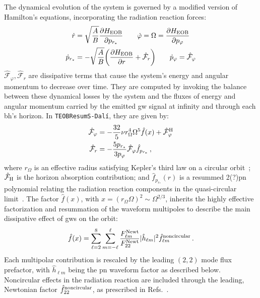 \documentclass[prd,amssymb,amsmath,amsfonts,nofootinbib,reprint,showpacs,longbibliography]{revtex4-1}
\newcommand{\dali}[0]{\texttt{TEOBResumS-Dalí}}
\begin{document}
The dynamical evolution of the system is governed by a modified version of Hamilton's equations,
incorporating the radiation reaction forces:
\begin{subequations}
\begin{align}
    \dot{r} &= \sqrt{\dfrac{A}{B}} \dfrac{\partial H_{\rm EOB}}{\partial p_{r_*}} \qquad 
    \dot{\varphi} = \Omega = \dfrac{\partial H_{\rm EOB}}{\partial p_\varphi} \\
    \dot{p}_{r_*} &= -\sqrt{\dfrac{A}{B}} \biggl(\dfrac{\partial H_{\rm EOB}}{\partial r} + \mathcal{\hat{F}}_r\biggr)\qquad 
    \dot{p}_\varphi = \mathcal{\hat{F}}_\varphi
\end{align}
\end{subequations}
$\mathcal{\hat{F}}_\varphi, \mathcal{\hat{F}}_r$ are dissipative terms that cause the system's
energy and angular momentum to decrease over time. They are computed by invoking the balance
between these dynamical losses by the system and the fluxes of energy and angular momentum
carried by the emitted \ac{gw} signal at infinity and through each \ac{bh}'s horizon.
In \dali, they are given by:
\begin{subequations}
\begin{align}
    \mathcal{\hat{F}}_\varphi &= -\dfrac{32}{5} \nu r_\Omega^4 \Omega^5 \hat{f}(x) + \mathcal{\hat{F}}^{\rm H}_\varphi \\
    \mathcal{\hat{F}}_r       &= -\dfrac{5p_{r_*}}{3p_\varphi} \mathcal{\hat{F}}_\varphi \hat{f}_{p_{r_*}}\, ,
\end{align}
\end{subequations}
where $r_\Omega$ is an effective radius satisfying Kepler's third law on a circular orbit~\cite{Damour:2014sva};
$\mathcal{\hat{F}}_{\rm H}$ is the horizon absorption contribution; and $\hat{f}_{p_{r_*}} (r)$ is 
a resummed 2(?)\ac{pn} polynomial relating the radiation reaction components in the quasi-circular limit~\cite{}.
The factor $\hat{f} (x)$, with $x = (r_\Omega \Omega)^2 \sim \Omega^{2/3}$, inherits the highly
effective factorization and resummation of the waveform multipoles to describe the main dissipative
effect of \acp{gw} on the orbit:
\begin{equation}
    \hat{f} (x) = \sum_{\ell = 2}^8 \sum_{m = -\ell}^{\ell} \dfrac{F_{\ell m}^{\rm Newt}}{F_{22}^{\rm Newt}}
    |\hat{h}_{\ell m}|^2 \hat{f}_{\ell m}^{\rm noncircular}\, .
\end{equation}
Each multipolar contribution is rescaled by the leading $(2,2)$ mode flux prefactor, with $\hat{h}_{\ell m}$
being the \ac{pn} waveform factor as described below. Noncircular effects in the radiation reaction
are included through the leading, Newtonian factor $\hat{f}_{22}^{\rm noncircular}$, as prescribed
in Refs.~\cite{Chiaramello:2020ehz,Nagar:2021xnh}.
\end{document}
